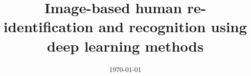 \documentclass[a4paper, 11pt, oneside]{Thesis}  %
\begin{document}

\title  {Image-based human re-identification and recognition using deep learning methods}
\addresses  {\groupname\\\deptname\\\univname}  %
\date       {\today}
\subject    {}
\keywords   {}

\maketitle


\fancyhead{}  %
\rhead{\thepage}  %
\lhead{}  %

\pagestyle{fancy}  %






\end{document}
